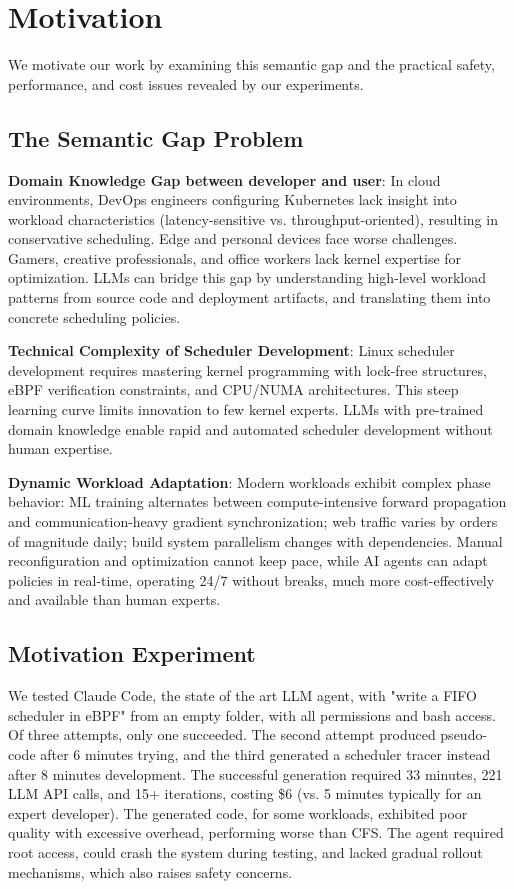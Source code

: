 \section{Motivation}
\label{sec:motivation}

We motivate our work by examining this semantic gap and the practical safety, performance, and cost issues revealed by our experiments.

\subsection{The Semantic Gap Problem}

\textbf{Domain Knowledge Gap between developer and user}: In cloud environments, DevOps engineers configuring Kubernetes lack insight into workload characteristics (latency-sensitive vs. throughput-oriented), resulting in conservative scheduling. Edge and personal devices face worse challenges. Gamers, creative professionals, and office workers lack kernel expertise for optimization. LLMs can bridge this gap by understanding high-level workload patterns from source code and deployment artifacts, and translating them into concrete scheduling policies.

\textbf{Technical Complexity of Scheduler Development}: Linux scheduler development requires mastering kernel programming with lock-free structures, eBPF verification constraints, and CPU/NUMA architectures. This steep learning curve limits innovation to few kernel experts. LLMs with pre-trained domain knowledge enable rapid and automated scheduler development without human expertise.

\textbf{Dynamic Workload Adaptation}: Modern workloads exhibit complex phase behavior: ML training alternates between compute-intensive forward propagation and communication-heavy gradient synchronization; web traffic varies by orders of magnitude daily; build system parallelism changes with dependencies. Manual reconfiguration and optimization cannot keep pace, while AI agents can adapt policies in real-time, operating 24/7 without breaks, much more cost-effectively and available than human experts.

\subsection{Motivation Experiment}

We tested Claude Code\cite{claudecode}, the state of the art LLM agent, with "write a FIFO scheduler in eBPF" from an empty folder, with all permissions and bash access. Of three attempts, only one succeeded. The second attempt produced pseudo-code after 6 minutes trying, and the third generated a scheduler tracer instead after 8 minutes development. The successful generation required 33 minutes, 221 LLM API calls, and 15+ iterations, costing \$6 (vs. 5 minutes typically for an expert developer). The generated code, for some workloads, exhibited poor quality with excessive overhead, performing worse than CFS. The agent required root access, could crash the system during testing, and lacked gradual rollout mechanisms, which also raises safety concerns.

